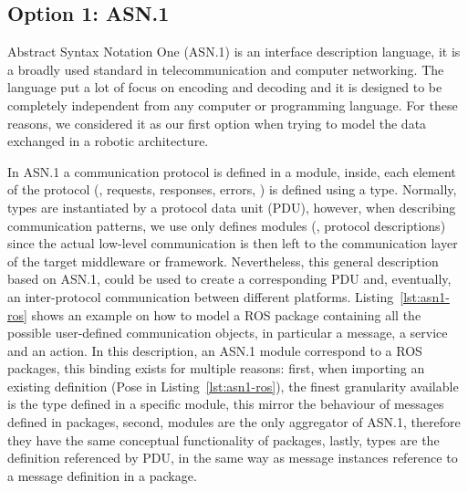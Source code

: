 \subsection{Option 1: ASN.1}
Abstract Syntax Notation One (ASN.1) is an interface description language, it is a broadly used standard in telecommunication and computer networking. The language put a lot of focus on encoding and decoding and it is designed to be completely independent from any computer or programming language. For these reasons, we considered it as our first option when trying to model the data exchanged in a robotic architecture.

In ASN.1 a communication protocol is defined in a module, inside, each element of the protocol (\eg, requests, responses, errors, \etc) is defined using a type. Normally, types are instantiated by a protocol data unit (PDU), however, when describing communication patterns, we use only defines modules (\ie, protocol descriptions) since the actual low-level communication is then left to the communication layer of the target middleware or framework. Nevertheless, this general description based on ASN.1, could be used to create a corresponding PDU and, eventually, an inter-protocol communication between different platforms. Listing~\ref{lst:asn1-ros} shows an example on how to model a ROS package containing all the possible user-defined communication objects, in particular a message, a service and an action. In this description, an ASN.1 module correspond to a ROS packages, this binding exists for multiple reasons: first, when importing an existing definition (Pose in Listing~\ref{lst:asn1-ros}), the finest granularity available is the type defined in a specific module, this mirror the behaviour of messages defined in packages, second, modules are the only aggregator of ASN.1, therefore they have the same conceptual functionality of packages, lastly, types are the definition referenced by PDU, in the same way as message instances reference to a message definition in a package.

